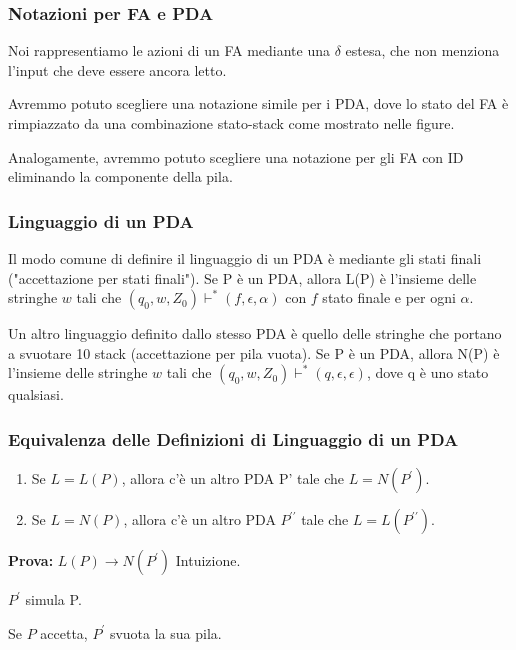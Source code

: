 \subsubsection{Notazioni per FA e PDA}
Noi rappresentiamo le azioni di un FA mediante una $\delta$ estesa, che non menziona l'input che deve essere ancora letto.

Avremmo potuto scegliere una notazione simile per i PDA, dove lo stato del FA è rimpiazzato da una combinazione stato-stack come mostrato nelle figure.

Analogamente, avremmo potuto scegliere
una notazione per gli FA con ID eliminando la componente della pila.

\subsubsection{Linguaggio di un PDA}
Il modo comune di definire il linguaggio di un PDA è mediante gli stati finali ("accettazione per stati finali").
Se P è un PDA, allora L(P) è l'insieme delle stringhe $w$ tali che $\left(q_{0}, w, Z_{0}\right) \vdash^{*} (f, \epsilon, \alpha)$ con $f$ stato finale e per ogni $\alpha$.

\vspace{5mm}

Un altro linguaggio definito dallo stesso PDA è quello delle stringhe che portano a svuotare 10 stack (accettazione per pila vuota).
Se P è un PDA, allora N(P) è l'insieme delle stringhe $w$ tali che $\left(q_{0}, w, Z_{0}\right) \vdash^{*} (q, \epsilon, \epsilon)$, dove q è uno stato qualsiasi.

\subsubsection{Equivalenza delle Definizioni di Linguaggio di un PDA}

\begin{enumerate}
    \item Se $L=L(P)$, allora c'è un altro PDA P' tale che $L=N\left(P^{\prime}\right)$.
    \item Se $L=N(P)$, allora c'è un altro PDA $P^{\prime \prime}$ tale che $L=L\left(P^{\prime \prime}\right)$.
\end{enumerate}

\textbf{Prova:} $L(P) \rightarrow N\left(P^{\prime}\right)$ Intuizione.

$P^{\prime}$ simula P.

Se $P$ accetta, $P^{\prime}$ svuota la sua pila.

